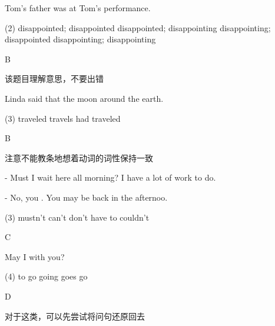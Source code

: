 \begin{question}[tags={xiaoxuect}]
Tom's father was \blank[width=1cm]{} at Tom's \blank[width=1cm]{} performance.

  \begin{tasks}(2)
    \task disappointed; disappointed
    \task disappointed; disappointing
    \task disappointing; disappointed
    \task disappointing; disappointing
  \end{tasks}
\end{question}
\begin{solution}
B

该题目理解意思，不要出错
\end{solution}

\begin{question}[tags={xiaoxuect}]
Linda said that the moon \blank[width=1cm]{} around the earth.

  \begin{tasks}(3)
    \task traveled
    \task travels
    \task had traveled
  \end{tasks}
\end{question}
\begin{solution}
B

注意不能教条地想着动词的词性保持一致
\end{solution}

\begin{question}[tags={xiaoxuect}]
- Must I wait here all morning? I have a lot of work to do.

\noindent - No, you \blank[width=1cm]{}. You may be back in the afternoo.

  \begin{tasks}(3)
    \task mustn't
    \task can't
    \task don't have to
    \task couldn't
  \end{tasks}
\end{question}
\begin{solution}
C
\end{solution}

\begin{question}[tags={xiaoxuect}]
May I \blank[width=1cm]{} with you?

  \begin{tasks}(4)
    \task to go
    \task going
    \task goes
    \task go
  \end{tasks}
\end{question}
\begin{solution}
D

对于这类，可以先尝试将问句还原回去
\end{solution}


